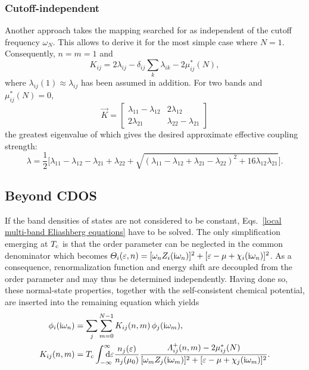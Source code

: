 \subsubsection{Cutoff-independent}
\label{cutoff-independent}

Another approach takes the mapping searched for as independent of the cutoff
frequency $\omega_N$. This allows to derive it for the most simple case where
$N = 1$. Consequently, $n = m = 1$ and
%
\begin{equation*}
    K_{i j} = 2 \lambda_{i j} - \delta_{i j} \sum_k \lambda_{i k}
    - 2 \mu^*_{i j}(N),
\end{equation*}
%
where $\lambda_{i j}(1) \approx \lambda_{i j}$ has been assumed in addition.
For two bands and $\mu^*_{i j}(N) = 0$,
%
\begin{equation*}
    \vec K = \begin{bmatrix}
        \lambda_{1 1} - \lambda_{1 2} & 2 \lambda_{1 2} \\
        2 \lambda_{2 1} & \lambda_{2 2} - \lambda_{2 1}
    \end{bmatrix}
\end{equation*}
%
the greatest eigenvalue of which gives the desired approximate effective
coupling strength:
%
\begin{equation*}
    \lambda = \frac 1 2 \Big[
        \lambda_{1 1} - \lambda_{1 2} - \lambda_{2 1} + \lambda_{2 2} + \sqrt{
            (\lambda_{1 1} - \lambda_{1 2} + \lambda_{2 1} - \lambda_{2 2})^2
            + 16 \lambda_{1 2} \lambda_{2 1}
            }
    \Big].
\end{equation*}

\subsection{Beyond CDOS}

If the band densities of states are not considered to be constant,
Eqs.~\ref{local multi-band Eliashberg equations} have to be solved. The only
simplification emerging at $T \sb{\text{c}}$ is that the order parameter can be
neglected in the common denominator which becomes $\varTheta_i(\varepsilon, n) =
[\omega_n Z_i(\mathrm i \omega_n)]^2 + [\varepsilon - \mu + \chi_i(\mathrm i \omega_n)]^2$. As a
consequence, renormalization function and energy shift are decoupled from the
order parameter and may thus be determined independently. Having done so, these
normal-state properties, together with the self-consistent chemical potential,
are inserted into the remaining equation which yields
%
\begin{equation} \label{linearized gap equation}
    \begin{split}
        \phi_i(\I \omega_n) &= \sum_j \sum_{m = 0}^{N - 1}
        K_{i j}(n, m) \, \phi_j(\I \omega_m),
        \\
        K_{i j}(n, m) &= T \sub c \int \from{-\infty} \till \infty \D \epsilon
        \frac{n_j(\epsilon)}{n_j(\mu_0)}
        \frac {\Lambda_{i j}^+(n, m) - 2 \mu^*_{i j}(N)}
        {[\omega_m Z_j(\I \omega_m)]^2 + [\epsilon - \mu + \chi_j(\I \omega_m)]^2}.
    \end{split}
\end{equation}

